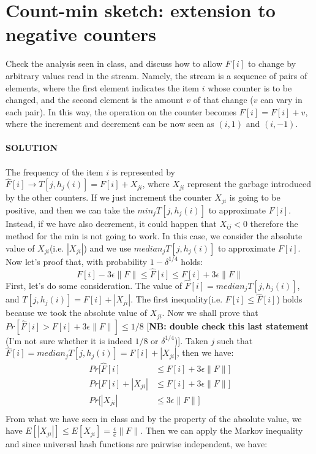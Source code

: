 \documentclass[a4paper]{article}
\begin{document}
\section*{Count-min sketch: extension to negative counters}
Check the analysis seen in class, and discuss how to allow $F[i]$ to change by arbitrary values read in the stream. Namely, the stream is a sequence of pairs of elements, where the first element indicates the item $i$ whose counter is to be changed, and the second element is the amount $v$ of that change ($v$ can vary in each pair). In this way, the operation on the counter becomes $F[i] = F[i]+v$, where the increment and decrement can be now seen as $(i, 1)$ and $(i, −1)$.
\\
\\
\textbf{SOLUTION}
\\
\\
The frequency of the item $i$ is represented by $\hat{F}[i]\rightarrow T[j, h_j(i)] = F[i] + X_{ji}$, where $X_{ji}$ represent the garbage introduced by the other counters. If we just increment the counter $X_{ji}$ is going to be positive, and then we can take the $min_j T[j,h_j(i)]$ to approximate $F[i]$.
Instead, if we have also decrement, it could happen that $X_{ij}<0$ therefore the method for the min is not going to work. In this case, we consider the absolute value of $X_{ji}$(i.e. $|X_{ji}|$) and  we use $median_j T[j, h_j(i)]$ to approximate $F[i]$. Now let's proof that, with probability $1-\delta^{1/4}$ holds:
\begin{equation}
F[i] - 3\epsilon \|F\|\leq \hat{F}[i] \leq F[i]  + 3\epsilon \|F\|
\nonumber
\end{equation}
First, let's do some consideration. The value of $\hat{F}[i]=median_j T[j, h_j(i)]$, and $T[j, h_j(i)]= F[i] +|X_{ji}| $. The first inequality(i.e. $F[i] \leq \hat{F}[i]$) holds because we took the absolute value of $X_{ji}$. Now we shall prove that $Pr[\hat{F}[i]> F[i]  + 3\epsilon \|F\|] \leq 1/8 $ [\textbf{NB: double check this last statement} (I'm not sure whether it is indeed $1/8$ or $\delta^{1/4}$)]. Taken $j$ such that $\hat{F}[i]=median_j T[j, h_j(i)] = F[i] +|X_{ji}|$, then we have:
\begin{align*}
Pr[\hat{F}[i] &\leq F[i]  + 3\epsilon \|F\|]\\
Pr[F[i] +|X_{ji}| &\leq F[i]  + 3\epsilon \|F\|]\\
Pr[|X_{ji}|&\leq 3\epsilon \|F\|]\\
\end{align*}
From what we have seen in class and by the property of the absolute value, we have $E[|X_{ji}|]\leq E[X_{ji}]= \frac{\epsilon}{e} \|F\|$. Then we can apply the Markov inequality and since universal hash functions are pairwise independent, we have:
\end{document}
